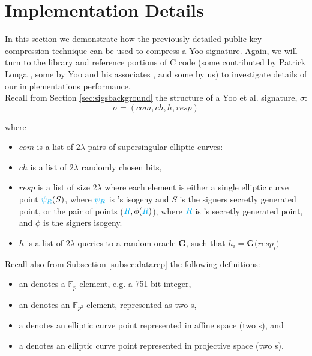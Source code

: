 \section{Implementation Details}
\label{sec:compimplementation}

In this section we demonstrate how the previously detailed public key compression technique can be used to compress a Yoo signature. Again, we will turn to the \sidh library and reference portions of C code (some contributed by Patrick Longa \cite{sidhcode}, some by Yoo and his associates \cite{yoosigcode}, and some by us) to investigate details of our implementations performance.\\

\noindent
Recall from Section \ref{sec:sigsbackground} the structure of a Yoo et al. signature, $\sigma$:
$$
\sigma = (com, ch, h, resp)
$$

\noindent
where

\begin{itemize}
\item $com$ is a list of $2\lambda$ pairs of supersingular elliptic curves: 
\item $ch$ is a list of $2\lambda$ randomly chosen bits,
\item $resp$ is a list of size $2\lambda$ where each element is either a single elliptic curve point $\textcolor{cyan}{\psi_R}(S)$, where $\textcolor{cyan}{\psi_R}$ is \randall's isogeny and $S$ is the signers secretly generated point, or the pair of points ($\textcolor{cyan}{R}, \phi(\textcolor{cyan}{R})$), where $\textcolor{cyan}{R}$ is \randall's secretly generated point, and $\phi$ is the signers isogeny.
\item $h$ is a list of $2\lambda$ queries to a random oracle \textbf{G}, such that $h_{i} = \textbf{G(}resp_{i}\textbf{)}$
\end{itemize}

\noindent
Recall also from Subsection \ref{subsec:datarep} the following definitions:
\begin{itemize}
\item an  denotes a $\mathbb{F}_{p}$ element, e.g. a 751-bit integer,
\item an  denotes an $\mathbb{F}_{p^2}$ element, represented as two s,
\item a  denotes an elliptic curve point represented in affine space (two s), and
\item a  denotes an elliptic curve point represented in projective space (two s).
\end{itemize}

